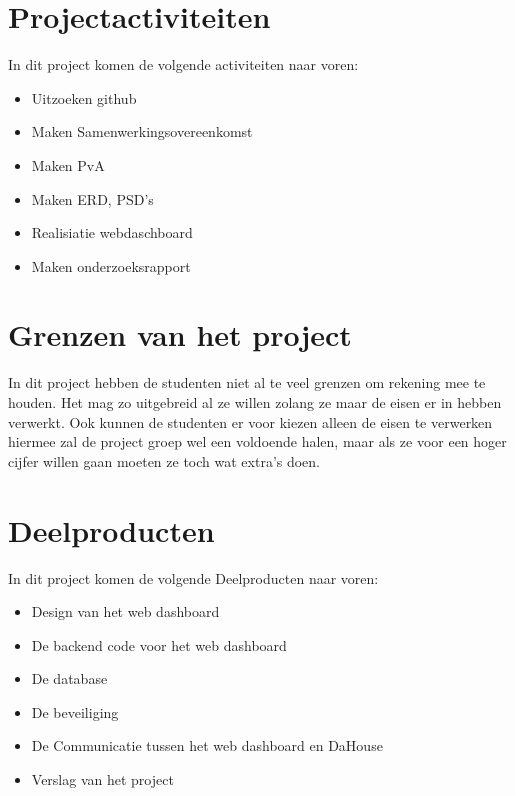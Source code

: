 \documentclass[11pt]{article}
\begin{document}
\newpage

\section{Projectactiviteiten}

\begin{flushleft}
	
	In dit project komen de volgende activiteiten naar voren:
	
	
	\begin{itemize}
		
		\item Uitzoeken github
		\item Maken Samenwerkingsovereenkomst
		\item Maken PvA
		\item Maken ERD, PSD's
		\item Realisiatie webdaschboard
		\item Maken onderzoeksrapport
	\end{itemize}
\end{flushleft}


\section[Grenzen] {Grenzen van het project}
\begin{flushleft}
In dit project hebben de studenten niet al te veel grenzen om rekening mee te houden. Het mag zo uitgebreid al ze willen zolang ze maar de eisen er in hebben verwerkt. Ook kunnen de studenten er voor kiezen alleen de eisen te verwerken hiermee zal de project groep wel een voldoende halen, maar als ze voor een hoger cijfer willen gaan moeten ze toch wat extra's doen. 
\newline
\newline
\end{flushleft}

\section{Deelproducten}

In dit project komen de volgende Deelproducten naar voren:

	\begin{itemize}
		\item  Design van het web dashboard
		\item De backend code voor het web dashboard
		\item De database
		\item De beveiliging
		\item De Communicatie tussen het web dashboard en DaHouse
		\item Verslag van het project
	\end{itemize}
\newpage
\end{document}
